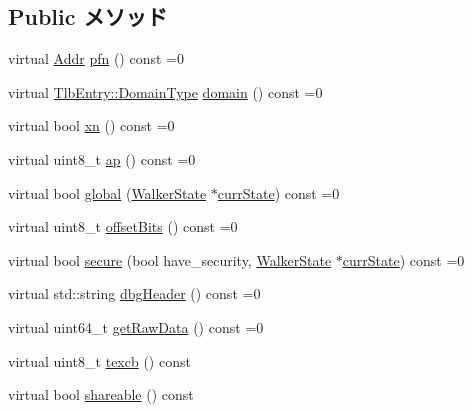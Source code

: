 \subsection*{Public メソッド}
\begin{DoxyCompactItemize}
\item 
virtual \hyperlink{classm5_1_1params_1_1Addr}{Addr} \hyperlink{classArmISA_1_1TableWalker_1_1DescriptorBase_a5e759a05b3056231f9f65a12f46c6a12}{pfn} () const =0
\item 
virtual \hyperlink{structArmISA_1_1TlbEntry_a0595b41cfb7d03f18438f9c355a3469d}{TlbEntry::DomainType} \hyperlink{classArmISA_1_1TableWalker_1_1DescriptorBase_af3d561535442b70040e5fd7ff04eff12}{domain} () const =0
\item 
virtual bool \hyperlink{classArmISA_1_1TableWalker_1_1DescriptorBase_a92c5947cbc7259f6e536de82f5b33e4f}{xn} () const =0
\item 
virtual uint8\_\-t \hyperlink{classArmISA_1_1TableWalker_1_1DescriptorBase_ab524583b20762c07d0a20a418b858586}{ap} () const =0
\item 
virtual bool \hyperlink{classArmISA_1_1TableWalker_1_1DescriptorBase_a87704122ae25a982d2e3d92c5b0e9c25}{global} (\hyperlink{classArmISA_1_1TableWalker_1_1WalkerState}{WalkerState} $\ast$\hyperlink{classArmISA_1_1TableWalker_a5d1a85a0248e318a8191d54988c8782d}{currState}) const =0
\item 
virtual uint8\_\-t \hyperlink{classArmISA_1_1TableWalker_1_1DescriptorBase_a21735b91214af921462c578b766a01ae}{offsetBits} () const =0
\item 
virtual bool \hyperlink{classArmISA_1_1TableWalker_1_1DescriptorBase_ab436e8aede9276b99fb2e8eac6d784a3}{secure} (bool have\_\-security, \hyperlink{classArmISA_1_1TableWalker_1_1WalkerState}{WalkerState} $\ast$\hyperlink{classArmISA_1_1TableWalker_a5d1a85a0248e318a8191d54988c8782d}{currState}) const =0
\item 
virtual std::string \hyperlink{classArmISA_1_1TableWalker_1_1DescriptorBase_a16f3fe8786507522f0f0298cb6c414f1}{dbgHeader} () const =0
\item 
virtual uint64\_\-t \hyperlink{classArmISA_1_1TableWalker_1_1DescriptorBase_a2d8a1d7c99e0e52420d8be6cbd821697}{getRawData} () const =0
\item 
virtual uint8\_\-t \hyperlink{classArmISA_1_1TableWalker_1_1DescriptorBase_a7d7e1ce90155279aa511dc49c2b887c2}{texcb} () const 
\item 
virtual bool \hyperlink{classArmISA_1_1TableWalker_1_1DescriptorBase_a2192d5ee6fa7a5fc873e6cdbe8827339}{shareable} () const 
\end{DoxyCompactItemize}
